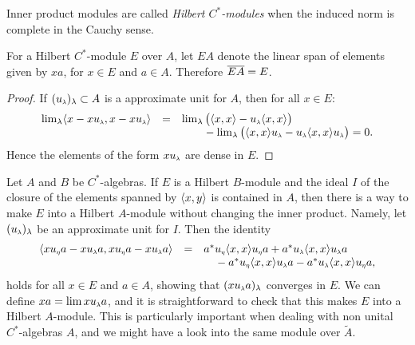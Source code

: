 \begin{definicao}
Inner product modules are called \textit{Hilbert \ensuremath{C^*}-modules} when the induced norm is complete in the Cauchy sense.
\end{definicao}

\begin{proposicao}\label{prop: EA = E}
For a Hilbert $C^*$-module $E$ over $A$, let $EA$ denote the linear span of elements given by $xa$, for $x\in E$ and $a\in A$. Therefore $\overline{EA} = E$.
\begin{proof}
If $(\sub u\lambda)_\lambda \subset A$ is a approximate unit for $A$, then for all $x\in E$:
\begin{equation*}
    \begin{array}{rcl}
        \lim_\lambda \inner{x-x\sub u\lambda}{x-x\sub u\lambda} &=& \lim_\lambda\big(\inner xx - \sub u\lambda \inner xx\big)  \\
        & & \hphantom{\lim_\lambda}- \lim_{\lambda} \big(\inner xx\sub u\lambda - \sub u\lambda \inner xx\sub u\lambda \big) = 0.
    \end{array}
\end{equation*}
Hence the elements of the form $x\sub u\lambda$ are dense in $E$. 
\end{proof}
\end{proposicao}

\begin{observacao}\label{obs: tornar um R-modulo em um K-modulo}
Let $A$ and $B$ be $C^*$-algebras. If $E$ is a Hilbert $B$-module and the ideal $I$ of the closure of the elements spanned by $\langle {x},{y}\rangle$ is contained in $A$, then there is a way to make $E$ into a Hilbert $A$-module without changing the inner product. Namely, let $(\sub u\lambda)_\lambda$ be an approximate unit for $I$. Then the identity
\begin{equation*}
\begin{array}{rcl}
    \inner{x \sub u\eta a-x \sub u\lambda a}{x \sub u\eta a-x \sub u\lambda a} &=& 
a^* \sub u\eta \inner xx \sub u\eta a+a^* \sub u\lambda \inner xx \sub u\lambda a \\ & & \hphantom{a^*}-a^* \sub u\eta \inner xx \sub u\lambda a-a^* \sub u\lambda \inner xx \sub u\eta a,
\end{array}
\end{equation*}
holds for all $x\in E$ and $a\in A$, showing that $(x\sub u\lambda a)_\lambda$ converges in $E$. We can define $x a=\lim x \sub u{\lambda} a$, and it is straightforward to check that this makes $E$ into a Hilbert $A$-module. This is particularly important when dealing with non unital $C^*$-algebras $A$, and we might have a look into the same module over $\widetilde A$.
\end{observacao}

